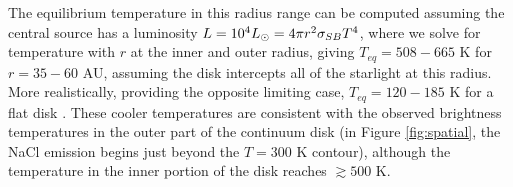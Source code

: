 \documentclass[twocolumn]{aastex62}
\begin{document}
The equilibrium temperature in this radius range can be computed assuming the central
source has a luminosity $L=10^4 L_{\odot} = 4 \pi r^2 \sigma_{SB} T^4 $, where we
solve for temperature with $r$ at the inner and outer radius, giving $T_{eq} =
508-665$ K for $r=35-60$ AU, assuming the disk intercepts all of the starlight 
at this radius.  More realistically, providing the opposite limiting case,
$T_{eq}=120-185$ K for a flat disk \citep{Chiang1997a}.  These cooler temperatures
are consistent with the observed brightness temperatures in the outer
part of the continuum disk (in Figure \ref{fig:spatial}, the NaCl emission
begins just beyond the $T=300$ K contour), although the temperature in the inner
portion of the disk reaches $\gtrsim500$ K.
\end{document}
